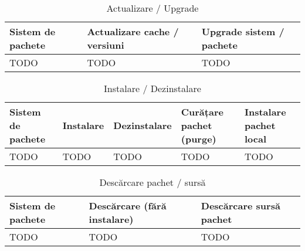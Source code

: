 \begin{table}[!htb]
  \caption{Actualizare / Upgrade}
  \begin{center}
    \begin{tabular}{ p{} p{} p{} }
      \toprule
        \textbf{Sistem de pachete} &
        \textbf{Actualizare cache / versiuni} &
        \textbf{Upgrade sistem / pachete} \\
      \midrule
        TODO &
        TODO &
        TODO \\
      \bottomrule
    \end{tabular}
    \label{tab:package:config-update}
  \end{center}
\end{table}

\begin{table}[!htb]
  \caption{Instalare / Dezinstalare}
  \begin{center}
    \begin{tabular}{ p{} p{} p{} p{} p{} }
      \toprule
        \textbf{Sistem de pachete} &
        \textbf{Instalare} &
        \textbf{Dezinstalare} &
        \textbf{Curățare pachet (purge)} &
        \textbf{Instalare pachet local} \\
      \midrule
        TODO &
        TODO &
        TODO &
        TODO &
        TODO \\
      \bottomrule
    \end{tabular}
    \label{tab:package:config-install}
  \end{center}
\end{table}

\begin{table}[!htb]
  \caption{Descărcare pachet / sursă}
  \begin{center}
    \begin{tabular}{ p{} p{} p{} }
      \toprule
        \textbf{Sistem de pachete} &
        \textbf{Descărcare (fără instalare)} &
        \textbf{Descărcare sursă pachet} \\
      \midrule
        TODO &
        TODO &
        TODO \\
      \bottomrule
    \end{tabular}
    \label{tab:package:config-download}
  \end{center}
\end{table}

